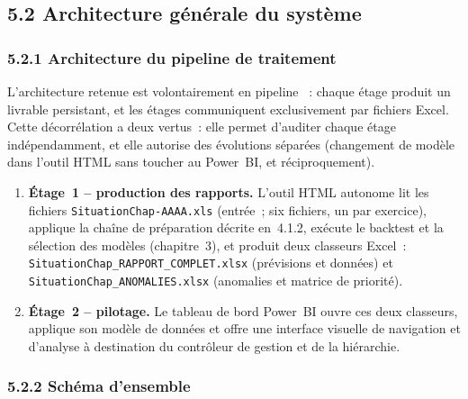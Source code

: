 \subsection*{5.2 \quad Architecture g\'en\'erale du syst\`eme}

\subsubsection*{5.2.1 \quad Architecture du pipeline de traitement}

L'architecture retenue est volontairement \og en pipeline \fg{}~: chaque
\'etage produit un livrable persistant, et les \'etages communiquent
exclusivement par fichiers Excel. Cette d\'ecorr\'elation a deux vertus~:
elle permet d'auditer chaque \'etage ind\'ependamment, et elle autorise des
\'evolutions s\'epar\'ees (changement de mod\`ele dans l'outil HTML sans
toucher au Power~BI, et r\'eciproquement).

\begin{enumerate}
    \item \textbf{\'Etage~1 -- production des rapports.} L'outil HTML
    autonome lit les fichiers \texttt{SituationChap-AAAA.xls} (entr\'ee~;
    six fichiers, un par exercice), applique la cha\^ine de pr\'eparation
    d\'ecrite en~4.1.2, ex\'ecute le backtest et la s\'election des mod\`eles
    (chapitre~3), et produit deux classeurs Excel~:
    \texttt{SituationChap\_RAPPORT\_COMPLET.xlsx} (pr\'evisions et donn\'ees)
    et \texttt{SituationChap\_ANOMALIES.xlsx} (anomalies et matrice de
    priorit\'e).
    \item \textbf{\'Etage~2 -- pilotage.} Le tableau de bord Power~BI ouvre
    ces deux classeurs, applique son mod\`ele de donn\'ees et offre une
    interface visuelle de navigation et d'analyse \`a destination du
    contr\^oleur de gestion et de la hi\'erarchie.
\end{enumerate}

\subsubsection*{5.2.2 \quad Sch\'ema d'ensemble}

